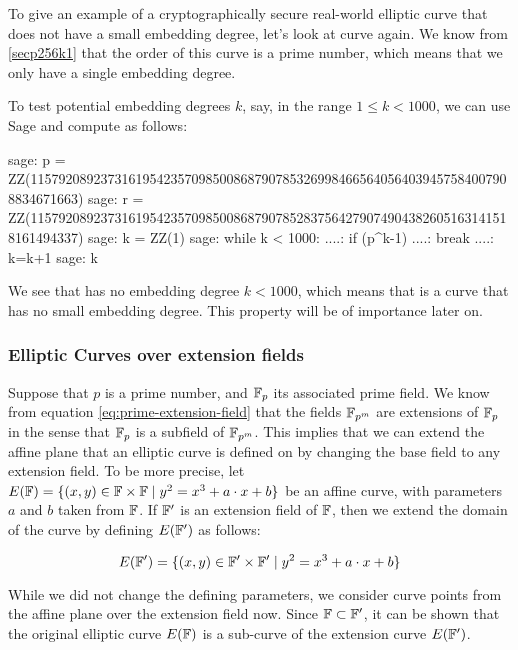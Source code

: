 \begin{example}
\label{ex:pairings_on_secp256k1}
 To give an example of a cryptographically secure real-world elliptic curve that does not have a small embedding degree, let's look at curve  again. We know from \examplename{} \ref{secp256k1} that the order of this curve is a prime number, which means that we only have a single embedding degree.

To test potential embedding degrees $k$, say, in the range $1\leq k < 1000$, we can use Sage and compute as follows:
\begin{sagecommandline}
sage: p = ZZ(115792089237316195423570985008687907853269984665640564039457584007908834671663)
sage: r = ZZ(115792089237316195423570985008687907852837564279074904382605163141518161494337)
sage: k = ZZ(1)
sage: while k < 1000:
....:     if (p^k-1)%
....:         break
....:     k=k+1
sage: k
\end{sagecommandline}
We see that  has no embedding degree $k<1000$, which means that   is a curve that has no small embedding degree. This property will be of importance later on.
\end{example}

\subsubsection{Elliptic Curves over extension fields}
 Suppose that $p$ is a prime number, and $\mathbb{F}_p$ its associated prime field. We know from equation \eqref{eq:prime-extension-field} that the fields $\mathbb{F}_{p^m}$ are extensions of $\mathbb{F}_p$ in the sense that $\mathbb{F}_{p}$ is a subfield of $\mathbb{F}_{p^m}$. This implies that we can extend the affine plane that an elliptic curve is defined on by changing the base field to any extension field. To be more precise, let 
$E(\mathbb{F})=\{ (x,y)\in \mathbb{F} \times \mathbb{F} \;|\; y^2 = x^3 +a\cdot x +b \}$ be an affine  curve, with parameters $a$ and $b$ taken from $\mathbb{F}$. If $\mathbb{F}'$ is an extension field of $\mathbb{F}$, then we extend the domain of the curve by defining $E(\mathbb{F}')$ as follows:

\begin{equation}\label{elliptic-curve-extension}
E(\mathbb{F}')=\{ (x,y)\in \mathbb{F}' \times \mathbb{F}' \;|\; y^2 = x^3 +a\cdot x +b \}
\end{equation}   

While we did not change the defining parameters, we consider curve points from the affine plane over the extension field now. Since $\mathbb{F}\subset \mathbb{F}'$, it can be shown that the original elliptic curve $E(\mathbb{F})$ is a sub-curve of the extension curve $E(\mathbb{F}')$.

